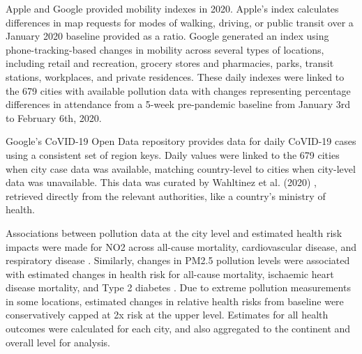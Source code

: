 \documentclass[preprint,12pt]{elsarticle}
\begin{document}
Apple\cite{Apple2020} and Google\cite{Google2020} provided mobility indexes in 2020. Apple's index calculates differences in map requests for modes of walking, driving, or public transit over a January 2020 baseline provided as a ratio. Google generated an index using phone-tracking-based changes in mobility across several types of locations, including retail and recreation, grocery stores and pharmacies, parks, transit stations, workplaces, and private residences. These daily indexes were linked to the 679 cities with available pollution data with changes representing percentage differences in attendance from a 5-week pre-pandemic baseline from January 3rd to February 6th, 2020\cite{owidcoronavirus}.

Google's CoVID-19 Open Data repository\cite{Google2022} provides data for daily CoVID-19 cases using a consistent set of region keys. Daily values were linked to the 679 cities when city case data was available, matching country-level to cities when city-level data was unavailable. This data was curated by Wahltinez et al. (2020) \citep{Wahltinez2020}, retrieved directly from the relevant authorities, like a country's ministry of health.

Associations between pollution data at the city level and estimated health risk impacts were made for NO2 across all-cause mortality, cardiovascular disease, and respiratory disease \cite{Huang19Pollution}. Similarly, changes in PM2.5 pollution levels were associated with estimated changes in health risk for all-cause mortality, ischaemic heart disease mortality, and Type 2 diabetes \cite{Xie257, Yu2020PM2.5}. Due to extreme pollution measurements in some locations, estimated changes in relative health risks from baseline were conservatively capped at 2x risk at the upper level. Estimates for all health outcomes were calculated for each city, and also aggregated to the continent and overall level for analysis. 
\end{document}
